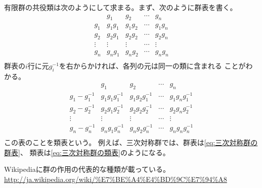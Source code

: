 	有限群の共役類は次のようにして求まる。まず、次のように群表を書く。
	\begin{equation*}\begin{array}{c|cccc} %
		& g_1 & g_2 & \cdots & g_n \\ \hline
		g_1 & g_1g_1 & g_1g_2 & \cdots & g_1g_n \\
		g_2 & g_2g_1 & g_2g_2 & \cdots & g_2g_n \\
		\vdots & \vdots & \vdots & \cdots & \vdots \\
		g_n & g_ng_1 & g_ng_2 & \cdots & g_ng_n \\
	\end{array}\end{equation*} %
	群表の$i$行に元$g_i^{-1}$を右からかければ、各列の元は同一の類に含まれる
	ことがわかる。
	\begin{equation*}\begin{array}{c|cccc} %
		& g_1 & g_2 & \cdots & g_n \\ \hline
		g_1-g_1^{-1} & g_1g_1g_1^{-1} & g_1g_2g_1^{-1} & \cdots & g_1g_ng_1^{-1} \\
		g_2-g_2^{-1} & g_2g_1g_2^{-1} & g_2g_2g_2^{-1} & \cdots & g_2g_ng_2^{-1} \\
		\vdots & \vdots & \vdots & \cdots & \vdots \\
		g_n-g_n^{-1} & g_ng_1g_n^{-1} & g_ng_2g_n^{-1} & \cdots & g_ng_ng_n^{-1} \\
	\end{array}\end{equation*} %
	この表のことを類表という。
	例えば、三次対称群では、群表は\eqref{eq:三次対称群の群表}、
	類表は\eqref{eq:三次対称群の類表}のようになる。

	\begin{todo}[作用の種類]\label{todo:作用の種類} %
		Wikipediaに群の作用の代表的な種類が載っている。
		\url{http://ja.wikipedia.org/wiki/%E7%BE%A4%E4%BD%9C%E7%94%A8}
	\end{todo} %
%

